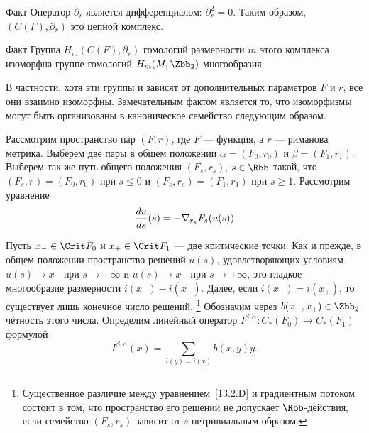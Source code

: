 \begin{thm}{Факт}\label{13.2.B}
  Оператор $\partial_{r}$ является дифференциалом: $\partial_{r}^{2}=0$.
  Таким образом, $(C(F),\partial_{r})$ это цепной комплекс. 
\end{thm}

\begin{thm}{Факт}\label{13.2.C}
  Группа $H_{m}(C(F),\partial_{r})$ гомологий размерности $m$ этого
  комплекса изоморфна группе гомологий $H_{m}(M, \Zbb_{2})$ многообразия.
\end{thm}

В частности, хотя эти группы и зависят от дополнительных параметров
$F$ и $r$, все они взаимно изоморфны.
Замечательным фактом является то, что изоморфизмы могут быть
организованы в каноническое семейство следующим образом.

Рассмотрим пространство пар $(F, r)$, где $F$ --- функция, а $r$ ---
риманова метрика. 
Выберем две пары в общем положении $\alpha = (F_{0}, r_{0})$ и
$\beta = (F_{1},r_{1})$. Выберем так же путь общего положения
$(F_{s},r_{s})$, $s\in\Rbb$ такой, что
$(F_{s}, r_{}) = (F_{0}, r_{0})$ при $s\leq0$ и
$(F_{s}, r_{s}) = (F_{1},r_{1})$ при $s\geq1$.
Рассмотрим уравнение
\begin{equation}\label{13.2.D}
  \frac{d u}{d s}(s)=-\nabla_{r_{s}}F_{s}(u(s))
\end{equation}

Пусть $x_{-}\in\Crit F_{0}$ и $x_{+}\in\Crit F_{1}$ --- две критические точки.
Как и прежде, в общем положении пространство решений $u(s)$,
удовлетворяющих условиям $u(s)\to x_{-}$ при $s\to-\infty$ и $u(s)\to
x_{+}$ при  $s\to+\infty$, это гладкое многообразие размерности
$i(x_{-})-i(x_{+})$.
Далее, если $i(x_{-}) = i(x_{+})$, то существует лишь конечное число
решений.%
\footnote{Существенное различие между уравнением~\ref{13.2.D} и
  градиентным потоком состоит в том, что пространство его решений
  не допускает $\Rbb$-действия, если семейство $(F_{s},r_{s})$ зависит
  от $s$ нетривиальным образом.}
Обозначим через $b(x_{-},x_{+})\in\Zbb_{2}$ чётность этого числа.
Определим линейный оператор
$I^{\beta,\alpha} : C_{*}(F_{0})\to C_{*}(F_{1})$ формулой
\[
I^{\beta,\alpha}(x) = \sum_{i(y)=i(x)}b(x, y)y.
\]

